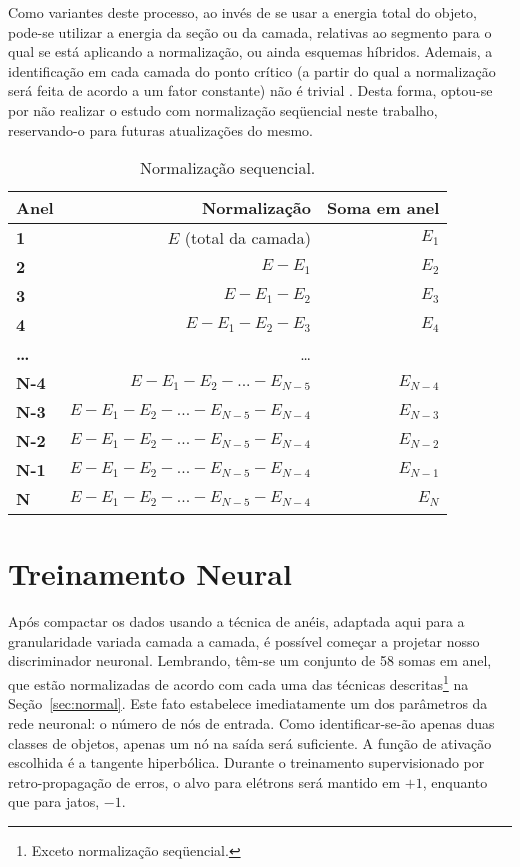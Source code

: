 \begin{description}
Como variantes deste processo, ao invés de se usar a energia total do objeto,
pode-se utilizar a energia da seção ou da camada, relativas ao segmento para o
qual se está aplicando a normalização, ou ainda esquemas híbridos. Ademais, a
identificação em cada camada do ponto crítico (a partir do qual a normalização
será feita de acordo a um fator constante) não é trivial
\cite{seixas:sp}. Desta forma, optou-se por não realizar o estudo com
normalização seqüencial neste trabalho, reservando-o para futuras atualizações
do mesmo.

\begin{table}
\renewcommand{\baselinestretch}{1}
\caption{Normalização sequencial.}
\label{tab:seq}
\begin{center}
\begin{tabular}{>{\bfseries}l r r}
Anel & Normalização & Soma em anel \\ \hline
1 & $E$ (total da camada) & $E_1$\\
2 & $E - E_1$ & $E_2$ \\
3 & $E - E_1 - E_2$ & $E_3$\\
4 & $E - E_1 - E_2 - E_3$ & $E_4$\\
\dots  & \dots \\
N-4 & $E - E_1 - E_2 - ... - E_{N-5}$ & $E_{N-4}$ \\
N-3 & $E - E_1 - E_2 - ... - E_{N-5} - E_{N-4}$ & $E_{N-3}$ \\
N-2 & $E - E_1 - E_2 - ... - E_{N-5} - E_{N-4}$ & $E_{N-2}$ \\
N-1 & $E - E_1 - E_2 - ... - E_{N-5} - E_{N-4}$ & $E_{N-1}$ \\
N & $E - E_1 - E_2 - ... - E_{N-5} - E_{N-4}$ & $E_N$ \\
\end{tabular}
\end{center}
\renewcommand{\baselinestretch}{1.5}
\end{table}

\end{description}

\section{Treinamento Neural}

Após compactar os dados usando a técnica de anéis, adaptada aqui para a
granularidade variada camada a camada, é possível começar a projetar nosso
discriminador neuronal. Lembrando, têm-se um conjunto de 58 somas em anel, que
estão normalizadas de acordo com cada uma das técnicas
descritas\footnote{Exceto normalização seqüencial.} na
Seção~\ref{sec:normal}. Este fato estabelece imediatamente um dos parâmetros
da rede neuronal: o número de nós de entrada. Como identificar-se-ão apenas
duas classes de objetos, apenas um nó na saída será suficiente. A função de
ativação escolhida é a tangente hiperbólica. Durante o treinamento
supervisionado por retro-propagação de erros, o alvo para elétrons será
mantido em $+1$, enquanto que para jatos, $-1$.

